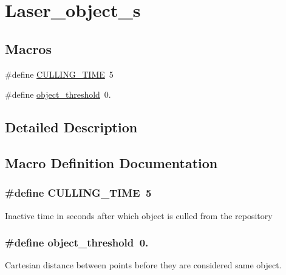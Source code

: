 \hypertarget{group__laser__object__s}{}\section{Laser\+\_\+object\+\_\+s}
\label{group__laser__object__s}
\subsection*{Macros}
\begin{DoxyCompactItemize}
\item 
\#define \hyperlink{group__laser__object__s_gaf735b65ab6833fed43b665e828e8b601}{C\+U\+L\+L\+I\+N\+G\+\_\+\+T\+I\+ME}~5
\item 
\#define \hyperlink{group__laser__object__s_ga12bd8d1fde7ba659b9d690f0c9a1762f}{object\+\_\+threshold}~0.
\end{DoxyCompactItemize}


\subsection{Detailed Description}


\subsection{Macro Definition Documentation}
\subsubsection[{\texorpdfstring{C\+U\+L\+L\+I\+N\+G\+\_\+\+T\+I\+ME}{CULLING_TIME}}]{\setlength{\rightskip}{0pt plus 5cm}\#define C\+U\+L\+L\+I\+N\+G\+\_\+\+T\+I\+ME~5}\hypertarget{group__laser__object__s_gaf735b65ab6833fed43b665e828e8b601}{}\label{group__laser__object__s_gaf735b65ab6833fed43b665e828e8b601}
Inactive time in seconds after which object is culled from the repository 
\subsubsection[{\texorpdfstring{object\+\_\+threshold}{object_threshold}}]{\setlength{\rightskip}{0pt plus 5cm}\#define object\+\_\+threshold~0.}\hypertarget{group__laser__object__s_ga12bd8d1fde7ba659b9d690f0c9a1762f}{}\label{group__laser__object__s_ga12bd8d1fde7ba659b9d690f0c9a1762f}
Cartesian distance between points before they are considered same object. 